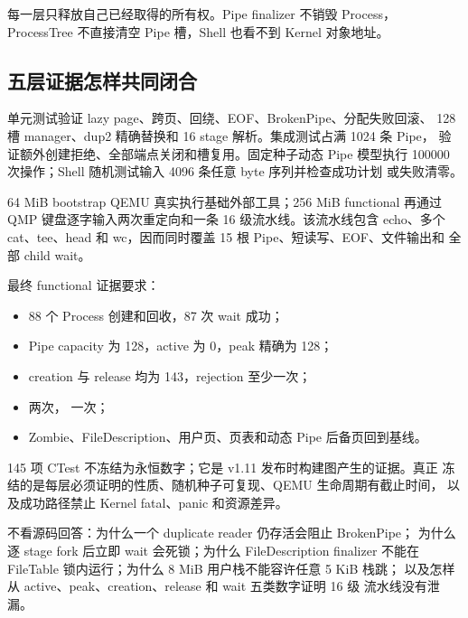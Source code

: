 每一层只释放自己已经取得的所有权。Pipe finalizer 不销毁 Process，
ProcessTree 不直接清空 Pipe 槽，Shell 也看不到 Kernel 对象地址。

\subsection{五层证据怎样共同闭合}

单元测试验证 lazy page、跨页、回绕、EOF、BrokenPipe、分配失败回滚、
128 槽 manager、dup2 精确替换和 16 stage 解析。集成测试占满 1024 条 Pipe，
验证额外创建拒绝、全部端点关闭和槽复用。固定种子动态 Pipe 模型执行
100000 次操作；Shell 随机测试输入 4096 条任意 byte 序列并检查成功计划
或失败清零。

64 MiB bootstrap QEMU 真实执行基础外部工具；256 MiB functional 再通过
QMP 键盘逐字输入两次重定向和一条 16 级流水线。该流水线包含 echo、多个
cat、tee、head 和 wc，因而同时覆盖 15 根 Pipe、短读写、EOF、文件输出和
全部 child wait。

最终 functional 证据要求：

\begin{itemize}
  \item 88 个 Process 创建和回收，87 次 wait 成功；
  \item Pipe capacity 为 128，active 为 0，peak 精确为 128；
  \item creation 与 release 均为 143，rejection 至少一次；
  \item {} 两次，
         一次；
  \item Zombie、FileDescription、用户页、页表和动态 Pipe 后备页回到基线。
\end{itemize}

145 项 CTest 不冻结为永恒数字；它是 v1.11 发布时构建图产生的证据。真正
冻结的是每层必须证明的性质、随机种子可复现、QEMU 生命周期有截止时间，
以及成功路径禁止 Kernel fatal、panic 和资源差异。

\begin{contractbox}
不看源码回答：为什么一个 duplicate reader 仍存活会阻止 BrokenPipe；
为什么逐 stage fork 后立即 wait 会死锁；为什么 FileDescription finalizer
不能在 FileTable 锁内运行；为什么 8 MiB 用户栈不能容许任意 5 KiB 栈跳；
以及怎样从 active、peak、creation、release 和 wait 五类数字证明 16 级
流水线没有泄漏。
\end{contractbox}

